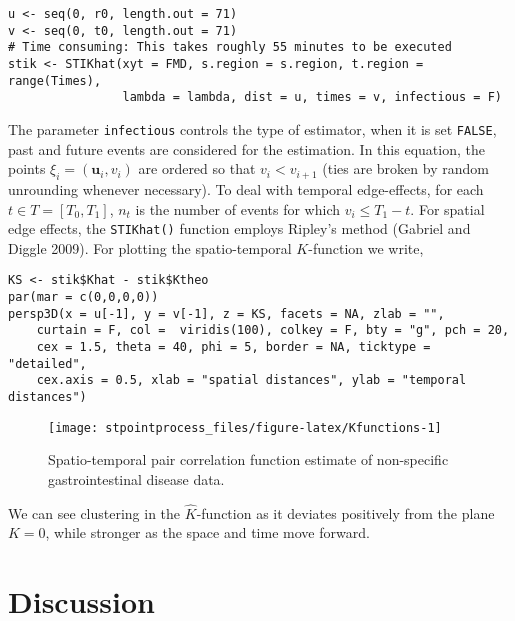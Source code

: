 \begin{verbatim}
u <- seq(0, r0, length.out = 71)
v <- seq(0, t0, length.out = 71)
# Time consuming: This takes roughly 55 minutes to be executed
stik <- STIKhat(xyt = FMD, s.region = s.region, t.region = range(Times),
                lambda = lambda, dist = u, times = v, infectious = F)
\end{verbatim}

The parameter \texttt{infectious} controls the type of estimator, when it is set \texttt{FALSE}, past and future events are considered for the estimation. In this equation, the points \(\xi_i=(\mathbf{u}_i, v_i)\) are ordered so that \(v_i<v_{i+1}\) (ties are broken by random unrounding whenever necessary). To deal with temporal edge-effects, for each \(t\in T=[T_0,T_1]\), \(n_t\) is the number of events for which \(v_i\leq T_1 - t\). For spatial edge effects, the \texttt{STIKhat()} function employs Ripley's method (Gabriel and Diggle 2009). For plotting the spatio-temporal \(K\)-function we write,

\begin{verbatim}
KS <- stik$Khat - stik$Ktheo
par(mar = c(0,0,0,0))
persp3D(x = u[-1], y = v[-1], z = KS, facets = NA, zlab = "",
    curtain = F, col =  viridis(100), colkey = F, bty = "g", pch = 20, 
    cex = 1.5, theta = 40, phi = 5, border = NA, ticktype = "detailed", 
    cex.axis = 0.5, xlab = "spatial distances", ylab = "temporal distances")
\end{verbatim}

\begin{figure}

{\centering \texttt{[image: stpointprocess\_files/figure-latex/Kfunctions-1]} 

}

\caption{Spatio-temporal pair correlation function estimate of non-specific gastrointestinal disease data.}\label{fig:Kfunctions}
\end{figure}

We can see clustering in the \(\hat{K}\)-function as it deviates positively from the plane \(K=0\), while stronger as the space and time move forward.

\hypertarget{discussion}{%
\section{Discussion}\label{discussion}}

